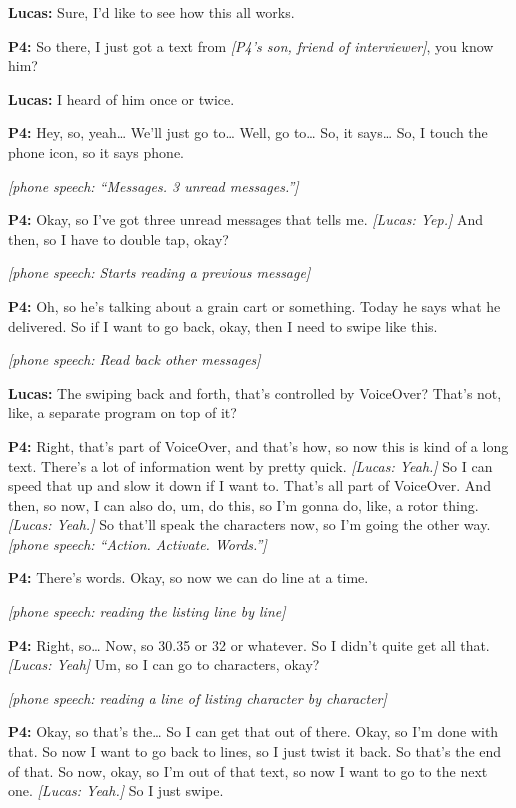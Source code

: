 \textbf{Lucas:} Sure, I'd like to see how this all works.

\textbf{P4:} So there, I just got a text from \textit{[P4's son, friend of interviewer]}, you know him?

\textbf{Lucas:} I heard of him once or twice.

\textbf{P4:} Hey, so, yeah\ldots{} We'll just go to\ldots{} Well, go to\ldots{} So, it says\ldots{} So, I touch the phone icon, so it says phone.

\textit{[phone speech: ``Messages. 3 unread messages.'']}

\textbf{P4:} Okay, so I've got three unread messages that tells me. \textit{[Lucas: Yep.]} And then, so I have to double tap, okay?

\textit{[phone speech: Starts reading a previous message]}

\textbf{P4:} Oh, so he's talking about a grain cart or something. Today he says what he delivered. So if I want to go back, okay, then I need to swipe like this.

\textit{[phone speech: Read back other messages]}

\textbf{Lucas:} The swiping back and forth, that's controlled by VoiceOver? That's not, like, a separate program on top of it?

\textbf{P4:} Right, that's part of VoiceOver, and that's how, so now this is kind of a long text. There's a lot of information went by pretty quick. \textit{[Lucas: Yeah.]} So I can speed that up and slow it down if I want to. That's all part of VoiceOver. And then, so now, I can also do, um, do this, so I'm gonna do, like, a rotor thing. \textit{[Lucas: Yeah.]} So that'll speak the characters now, so I'm going the other way.\\
\textit{[phone speech: ``Action. Activate. Words.'']}

\textbf{P4:} There's words. Okay, so now we can do line at a time.

\textit{[phone speech: reading the listing line by line]}

\textbf{P4:} Right, so\ldots{} Now, so 30.35 or 32 or whatever. So I didn't quite get all that. \textit{[Lucas: Yeah]} Um, so I can go to characters, okay?

\textit{[phone speech: reading a line of listing character by character]}

\textbf{P4:} Okay, so that's the\ldots{} So I can get that out of there. Okay, so I'm done with that. So now I want to go back to lines, so I just twist it back. So that's the end of that. So now, okay, so I'm out of that text, so now I want to go to the next one. \textit{[Lucas: Yeah.]} So I just swipe.


